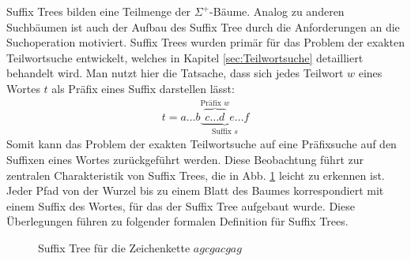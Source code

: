 \documentclass[12pt]{report}
\begin{document}
Suffix Trees bilden eine Teilmenge der $\Sigma^+$-Bäume. Analog zu anderen Suchbäumen ist auch der Aufbau des Suffix Tree durch die Anforderungen an die Suchoperation motiviert. Suffix Trees wurden primär für das Problem der exakten Teilwortsuche entwickelt, welches in Kapitel \ref{sec:Teilwortsuche} detailliert behandelt wird. Man nutzt hier die Tatsache, dass sich jedes Teilwort $w$ eines Wortes $t$ als Präfix eines Suffix darstellen lässt:
\begin{gather*}
    t = a \dots b \underbrace{\overbrace{c \dots d}^{\text{Präfix }w} e \dots f}_{\text{Suffix }s}
\end{gather*}
Somit kann das Problem der exakten Teilwortsuche auf eine Präfixsuche auf den Suffixen eines Wortes zurückgeführt werden. Diese Beobachtung führt zur zentralen Charakteristik von Suffix Trees, die in Abb. \ref{fig:suffixTreeAgcgacgag} leicht zu erkennen ist. Jeder Pfad von der Wurzel bis zu einem Blatt des Baumes korrespondiert mit einem Suffix des Wortes, für das der Suffix Tree aufgebaut wurde. Diese Überlegungen führen zu folgender formalen Definition für Suffix Trees.

\begin{figure}[htb]
\centering
{}
\caption{Suffix Tree für die Zeichenkette $agcgacgag$}
\label{fig:suffixTreeAgcgacgag}
\end{figure}
\end{document}
